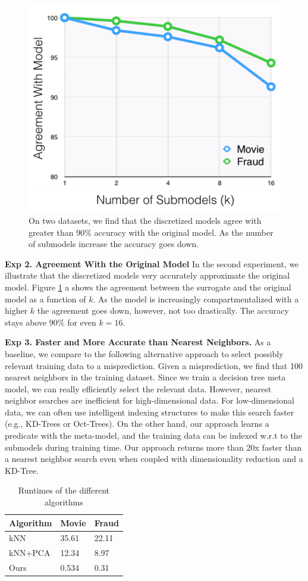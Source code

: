 \begin{figure}[ht]
    \centering
    \includegraphics[width=0.6\columnwidth]{figures/agreement.png}
    \caption{On two datasets, we find that the discretized models agree with greater than 90\% accuracy with the original model. As the number of submodels increase the accuracy goes down.}
    \label{fig:agreement}
\end{figure}

\vspace{0.5em} \noindent \textbf{Exp 2. Agreement With the Original Model}
In the second experiment, we illustrate that the discretized models very accurately approximate the original model.
Figure \ref{fig:agreement} a shows the agreement between the surrogate and the original model as a function of $k$. As the model is increasingly compartmentalized with a higher $k$ the agreement goes down, however, not too drastically. The accuracy stays above 90\% for even $k=16$.


\vspace{0.5em} \noindent \textbf{Exp 3. Faster and More Accurate than Nearest Neighbors. }  
As a baseline, we compare to the following alternative approach to select possibly relevant training data to a misprediction. Given a misprediction, we find that 100 nearest neighbors in the training dataset. Since we train a decision tree meta model, we can really efficiently select the relevant data. However, nearest neighbor searches are inefficient for high-dimensional data.
For low-dimensional data, we can often use intelligent indexing structures to make this search faster (e.g., KD-Trees or Oct-Trees).
On the other hand, our approach learns a predicate with the meta-model, and the training data can be indexed w.r.t to the submodels during training time.
Our approach returns more than 20x faster than a nearest neighbor search even when coupled with dimensionality reduction and a KD-Tree.

\begin{table}[ht!]
\centering
\caption{Runtimes of the different algorithms}
\label{my-label}
\begin{tabular}{lll}
Algorithm & Movie & Fraud \\ \hline
kNN & 35.61 & 22.11  \\
kNN+PCA & 12.34 & 8.97  \\
Ours & 0.534 & 0.31 
\end{tabular}
\end{table}


